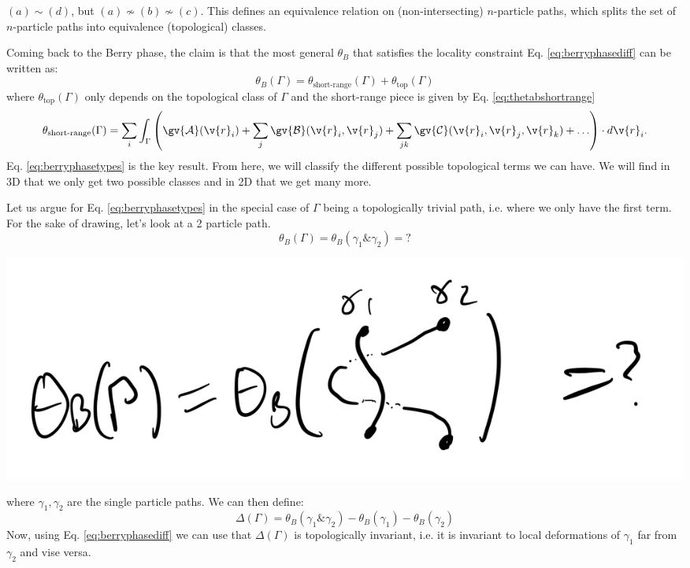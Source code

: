 $(a) \sim (d)$, but $(a) \not\sim (b) \not\sim (c)$. This defines an equivalence relation on (non-intersecting) $n$-particle paths, which splits the set of $n$-particle paths into equivalence (topological) classes. 

Coming back to the Berry phase, the claim is that the most general $\theta_B$ that satisfies the locality constraint Eq. \eqref{eq:berryphasediff} can be written as:
\begin{equation}\label{eq:berryphasetypes}
    \boxed{\theta_B(\Gamma) = \theta_{\text{short-range}}(\Gamma) + \theta_{\text{top}}(\Gamma)}
\end{equation}
where $\theta_{\text{top}}(\Gamma)$ only depends on the topological class of $\Gamma$ and the short-range piece is given by Eq. \eqref{eq:thetabshortrange}
\begin{equation}
    \theta_{\text{short-range}}(\Gamma) = \sum_i\int_\Gamma\left(\gv{\mathcal{A}}(\v{r}_i) + \sum_j \gv{\mathcal{B}}(\v{r}_i, \v{r}_j) + \sum_{jk}\gv{\mathcal{C}}(\v{r}_i, \v{r}_j, \v{r}_k) + \ldots\right)\cdot d\v{r}_i.
\end{equation}
Eq. \eqref{eq:berryphasetypes} is the key result. From here, we will classify the different possible topological terms we can have. We will find in 3D that we only get two possible classes and in 2D that we get many more.

Let us argue for Eq. \eqref{eq:berryphasetypes} in the special case of $\Gamma$ being a topologically trivial path, i.e. where we only have the first term. For the sake of drawing, let's look at a 2 particle path.
\begin{equation}
    \theta_B(\Gamma) = \theta_B(\gamma_1 \& \gamma_2) = ?
\end{equation}
\begin{center}
    \includegraphics[scale=0.3]{Lectures/Images/lec4-thetaBtwo.png}
\end{center}
where $\gamma_1, \gamma_2$ are the single particle paths. We can then define:
\begin{equation}
    \Delta(\Gamma) = \theta_B(\gamma_1 \& \gamma_2) - \theta_B(\gamma_1) - \theta_B(\gamma_2)
\end{equation}
Now, using Eq. \eqref{eq:berryphasediff} we can use that $\Delta(\Gamma)$ is topologically invariant, i.e. it is invariant to local deformations of $\gamma_1$ far from $\gamma_2$ and vise versa. 

